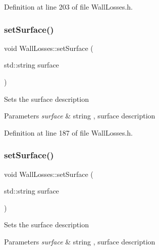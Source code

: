 Definition at line 203 of file Wall\+Losses.\+h.

\mbox{\label{class_wall_losses_af329a27b78e1f2d84af6a48ffc59bfad}} 
\subsubsection{\texorpdfstring{set\+Surface()}{setSurface()}\hspace{0.1cm}{\footnotesize\ttfamily [1/3]}}
{\footnotesize\ttfamily void Wall\+Losses\+::set\+Surface (\begin{DoxyParamCaption}\item[{std\+::string}]{surface }\end{DoxyParamCaption})\hspace{0.3cm}{\ttfamily [inline]}}

Sets the surface description 
\begin{DoxyParams}{Parameters}
{\em surface} & string , surface description \\
\hline
\end{DoxyParams}


Definition at line 187 of file Wall\+Losses.\+h.

\mbox{\label{class_wall_losses_af329a27b78e1f2d84af6a48ffc59bfad}} 
\subsubsection{\texorpdfstring{set\+Surface()}{setSurface()}\hspace{0.1cm}{\footnotesize\ttfamily [2/3]}}
{\footnotesize\ttfamily void Wall\+Losses\+::set\+Surface (\begin{DoxyParamCaption}\item[{std\+::string}]{surface }\end{DoxyParamCaption})\hspace{0.3cm}{\ttfamily [inline]}}

Sets the surface description 
\begin{DoxyParams}{Parameters}
{\em surface} & string , surface description \\
\hline
\end{DoxyParams}


